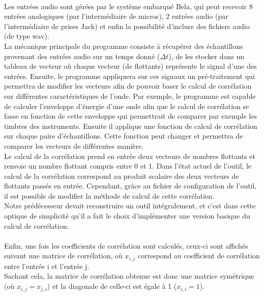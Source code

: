 \documentclass{article}
\begin{document}
\paragraph{}
Les entrées audio sont gérées par le système embarqué Bela, qui peut
recevoir 8 entrées analogiques (par l'intermédiaire de micros), 2 entrées
audio (par l'intermédiaire de prises Jack) et enfin la possibilité d'inclure
des fichiers audio (de type wav).\\
La mécanique principale du programme consiste à récupérer des échantillons
provenant des entrées audio sur un temps donné ($\Delta t$), de les stocker dans
un tableau de vecteur où chaque vecteur (de flottants) représente le signal d'une des entrées.
Ensuite, le programme appliquera sur ces signaux un pré-traitement qui permettra
de modifier les vecteurs afin de pouvoir baser le calcul de corrélation sur différentes
caractéristiques de l'onde. Par exemple, le programme est capable de calculer
l'enveloppe d’énergie d'une onde afin que le calcul de corrélation se fasse en fonction
de cette enveloppe qui permettrait de comparer par exemple les timbres des instruments.
Ensuite il applique une fonction de calcul de corrélation sur chaque paire d'échantillons.
Cette fonction peut changer et permettra de comparer les vecteurs de différentes manière.
\\
Le calcul de la corrélation prend en entrée deux vecteurs de
nombres flottants et renvoie un nombre flottant compris entre 0 et 1.
Dans l'état actuel de l'outil, le calcul de la corrélation correspond au
produit scalaire des deux vecteurs de flottants passés en entrée. Cependant,
grâce au fichier de configuration de l'outil, il est possible de modifier la
méthode de calcul de cette corrélation.\\
Notre prédécesseur devait reconstruire un outil intégralement, et c'est dans
cette optique de simplicité qu'il a fait le choix d'implémenter une version
basique du calcul de corrélation.
\paragraph{}
Enfin, une fois les coefficients de corrélation sont calculés, ceux-ci sont
affichés suivant une matrice de corrélation, où $x_{i,j}$ correspond au
coefficient de corrélation entre l'entrée i et l'entrée j.\\
Sachant cela, la matrice de corrélation obtenue est donc une matrice
symétrique (où $x_{i,j} = x_{j,i}$) et la diagonale de celle-ci est égale à
1 ($x_{i,i} = 1$).
\end{document}
